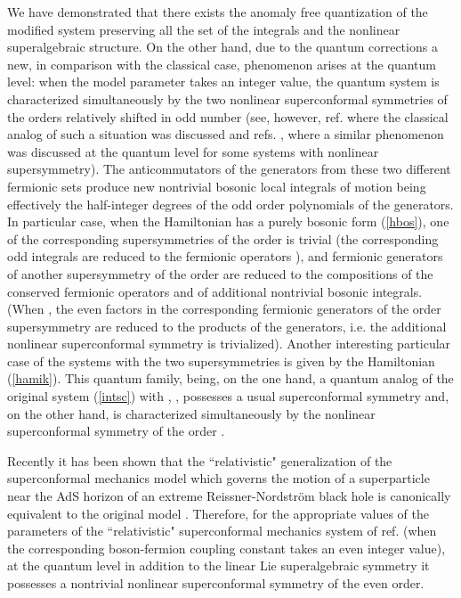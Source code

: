 \documentclass[a4paper,12pt]{article}
\def\N{\mathbb N}
\begin{document}
We have demonstrated that there exists
the anomaly free
quantization
of the modified system preserving
all the set of the integrals
and the nonlinear superalgebraic structure.
On the other hand,
due to the quantum corrections a new,
in comparison with the classical case,
phenomenon arises at the quantum level:
when the model parameter \myHighlight{$\alpha$}\coordHE{} takes an integer value,
the quantum system is characterized
simultaneously by the two nonlinear
superconformal symmetries of the orders relatively
shifted in odd number
(see, however, ref. \cite{KP1} where the classical
analog of such a situation was discussed
and refs. \cite{ACIN,AS}, where a similar phenomenon
was discussed at the quantum level for
some systems with \coordHE{} nonlinear supersymmetry).
The anticommutators of
the generators from these two different fermionic sets
produce new nontrivial bosonic local integrals of
motion being effectively
the half-integer degrees of the
odd order polynomials
of the
\coordHE{}
generators.
In particular case, when the Hamiltonian has a purely
bosonic form (\ref{hbos}),
one of the corresponding supersymmetries
of the order \coordHE{} is trivial
 (the corresponding odd integrals
are reduced to the  fermionic operators \myHighlight{$\psi^\pm$}\coordHE{}),
and fermionic generators of another supersymmetry
of the order \coordHE{} are
reduced to the  compositions of the
conserved fermionic operators \myHighlight{$\psi^\pm$}\coordHE{}
and of additional nontrivial bosonic integrals.
(When \coordHE{}, the even factors in the corresponding
fermionic generators of
the order \coordHE{} supersymmetry are
reduced to the products of the \coordHE{} generators,
i.e. the additional nonlinear superconformal symmetry
is trivialized).
Another interesting particular case of the
systems with the two supersymmetries is given
by the Hamiltonian (\ref{hamik}).
This quantum family,
being, on the one hand, a quantum analog of the
original system
(\ref{intsc}) with \coordHE{}, \myHighlight{$p\in \N$}\coordHE{},
possesses a usual \coordHE{}
superconformal symmetry and, on the other hand,
is characterized simultaneously  by the
nonlinear superconformal symmetry of
the order \coordHE{}.

Recently it has been shown \cite{Kum,CKZ,CCM,Iva2}
that the ``relativistic" generalization
of the superconformal mechanics model
which  governs the motion of a superparticle
near the AdS  horizon of an extreme
Reissner-Nordstr\"om black hole \cite{BH}
is canonically equivalent to the original model
\cite{AP,FR}.
Therefore, for the appropriate values
of the parameters of the ``relativistic"
superconformal mechanics system of ref.
\cite{BH}
(when the corresponding boson-fermion coupling constant
takes an even integer value), at the quantum level
in addition to the linear \coordHE{}
Lie superalgebraic symmetry
it possesses a nontrivial nonlinear superconformal
symmetry of the even order.
\end{document}

